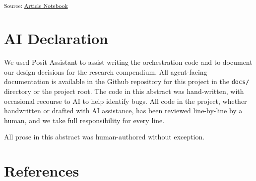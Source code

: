\documentclass[
  letterpaper,
  DIV=11,
  numbers=noendperiod]{scrartcl}
\begin{document}
\textsubscript{Source:
\href{https://uom-digital-studies.github.io/aeolus-microtexts/index.qmd.html}{Article
Notebook}}

\section{AI Declaration}\label{ai-declaration}

We used Posit Assistant to assist writing the orchestration code and to
document our design decisions for the research compendium. All
agent-facing documentation is available in the Github repository for
this project in the \texttt{docs/} directory or the project root. The
code in this abstract was hand-written, with occasional recourse to AI
to help identify bugs. All code in the project, whether handwritten or
drafted with AI assistance, has been reviewed line-by-line by a human,
and we take full responsibility for every line.

All prose in this abstract was human-authored without exception.

\section*{References}\label{references}
\end{document}
